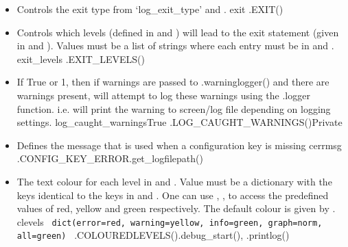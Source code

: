 \begin{itemize}
\ifdevguide
\item \label{text:exit_controller} 
{Controls the exit type from `log\_exit\_type' and .}
{exit}
{\AllRecipes}{\spirouConst.EXIT()}{\spirouLog}
\fi


\ifdevguide
\item \label{text:exit_levels} 
{Controls which levels (defined in  and ) will lead to the exit statement (given in  and ). Values must be a list of strings where each entry must be in  and .}
{exit\_levels}
{\AllRecipes}{\spirouConst.EXIT\_LEVELS()}{\spirouLog}
\fi


\ifdevguide
\item {}
{If True or 1, then if warnings are passed to \spirouLog.warninglogger() and there are warnings present, will attempt to log these warnings using the \spirouLog.logger function. i.e. will print the warning to screen/log file depending on logging settings.}
{log\_caught\_warnings}{True}
{\AllRecipes}{\spirouConst.LOG\_CAUGHT\_WARNINGS()}{\spirouLog}{Private}
\fi

\ifdevguide
\item {}
{Defines the message that is used when a configuration key is missing}
{cerrmsg}
{\AllRecipes}{\spirouConst.CONFIG\_KEY\_ERROR}{\spirouLog.get\_logfilepath()}
\fi

\ifdevguide
\item \label{text:colouredlevels} 
{The text colour for each level in  and . Value must be a dictionary with the keys identical to the keys in  and . One can use , ,  to access the predefined values of red, yellow and green respectively. The default colour is given by .}
{clevels}
{\lstinline[style=pythoninline]| dict(error=red, warning=yellow, info=green, graph=norm, all=green) |}
{\AllRecipes}{\spirouConst.COLOUREDLEVELS()}{\spirouLog.debug\_start(), \spirouLog.printlog()}
\fi


\end{itemize}
